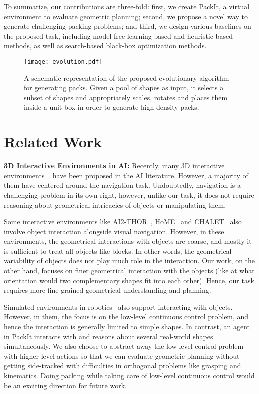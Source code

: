 \documentclass{article}
\begin{document}
To summarize, our contributions are three-fold: first, we create PackIt, a virtual environment to evaluate geometric planning; second, we propose a novel way to generate challenging packing problems; and third, we design various baselines on the proposed task, including model-free learning-based and heuristic-based methods, as well as search-based black-box optimization methods.

\begin{figure}[t]
\texttt{[image: evolution.pdf]}
  \caption{A schematic representation of the proposed evolutionary algorithm for generating packs. Given a pool of shapes as input, it selects a subset of shapes and appropriately scales, rotates and places them inside a unit box in order to generate high-density packs.}
  \centering
  \label{evolution}
\end{figure}
\section{Related Work}
\noindent \textbf{3D Interactive Environments in AI:} Recently, many 3D interactive environments ~\cite{Kempka2016ViZDoom,savva2017minos,wu2018building,krishnaswamy2019combining,pustejovsky2019situational,xia2018gibson} have been proposed in the AI literature. However, a majority of them have centered around the navigation task. Undoubtedly, navigation is a challenging problem in its own right, however, unlike our task, it does not require reasoning about geometrical intricacies of objects or manipulating them.

Some interactive environments like AI2-THOR~\cite{ai2thor}, HoME~\cite{brodeur2017home} and CHALET~\cite{yan2018chalet} also involve object interaction alongside visual navigation. However, in these environments, the geometrical interactions with objects are coarse, and mostly it is sufficient to treat all objects like blocks. In other words, the geometrical variability of objects does not play much role in the interaction.  Our work, on the other hand, focuses on finer geometrical interaction with the objects (like at what orientation would two complementary shapes fit into each other). Hence, our task requires more fine-grained geometrical understanding and planning. 

Simulated environments in robotics~\cite{alomari2017natural,alomari2017learning,plappert2018multi,fan2018surreal} also support interacting with objects. However, in them, the focus is on the low-level continuous control problem, and hence the interaction is generally limited to simple shapes. In contrast, an agent in PackIt interacts with and reasons about several real-world shapes simultaneously. We also choose to abstract away the low-level control problem with higher-level actions so that we can evaluate geometric planning without getting side-tracked with difficulties in orthogonal problems like grasping and kinematics. Doing packing while taking care of low-level continuous control would be an exciting direction for future work.
\end{document}
